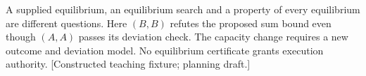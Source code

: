 \documentclass[11pt]{article}\usepackage[paperwidth=7in,paperheight=10in,textwidth=4.5in,textheight=8in,centering]{geometry}
\begin{document}
\begin{center}

\end{center}\medskip\noindent\footnotesize\raggedright A supplied equilibrium, an equilibrium search and a property of every equilibrium are different questions. Here $(B,B)$ refutes the proposed sum bound even though $(A,A)$ passes its deviation check. The capacity change requires a new outcome and deviation model. No equilibrium certificate grants execution authority. [Constructed teaching fixture; planning draft.]
\end{document}
